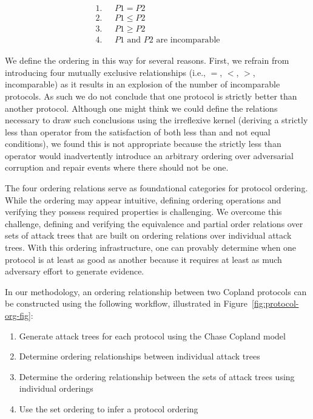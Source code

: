 \documentclass[runningheads]{llncs}
\theoremstyle{definition}
\newcommand{\squash}{\itemsep=0pt\parskip=0pt}
\begin{document}
\vspace*{-5mm}

\begin{align*}
1. & \text{ } P1 = P2 \\
2. & \text{ } P1 \le P2 \\
3. & \text{ } P1 \ge P2 \\
4. & \text{ } P1 \text{ and } P2 \text{ are incomparable}
\end{align*}

\noindent We define the ordering in this way for several
reasons. First, we refrain from introducing four mutually exclusive
relationships (i.e., $=$, $<$, $>$, incomparable) as it results in an
explosion of the number of incomparable protocols. As such we
do not conclude that one protocol is strictly better than another
protocol. Although one might think we could define the relations
necessary to draw such conclusions using the irreflexive kernel
(deriving a strictly less than operator from the satisfaction of both
less than and not equal conditions), we found this is not appropriate
because the strictly less than operator would inadvertently introduce
an arbitrary ordering over adversarial corruption and repair events
where there should not be one.

The four ordering relations serve as foundational categories for
protocol ordering. While the ordering may appear intuitive, defining
ordering operations and verifying they possess required properties is
challenging. We overcome this challenge, defining and verifying the
equivalence and partial order relations over sets of attack trees that
are built on ordering relations over individual attack trees. With
this ordering infrastructure, one can provably determine when one
protocol is at least as good as another because it requires at least
as much adversary effort to generate evidence.

In our methodology, an ordering relationship between two Copland
protocols can be constructed using the following workflow, illustrated
in Figure~\ref{fig:protocol-org-fig}:

\begin{enumerate}
  \squash
\item Generate attack trees for each protocol using the Chase Copland model
\item Determine ordering relationships between individual attack trees
\item Determine the ordering relationship between the sets of attack
  trees using individual orderings
\item Use the set ordering to infer a protocol ordering
\end{enumerate}
\end{document}
